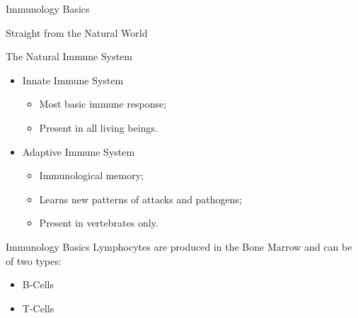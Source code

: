 \documentclass[xcolor=svgnames]{beamer}
\newcommand{\introframe}[2]{
    \begin{frame}
	   \vfill
	   \hfill\Huge{#1}
	   
	   \vspace{1em}
	   
	   \hfill\Large{#2}
	   \vfill
    \end{frame}
}
\begin{document}
	\introframe{Immunology Basics}{Straight from the Natural World}
	
        \begin{frame}{The Natural Immune System}        
            \begin{itemize}
                \item Innate Immune System
                \begin{itemize}
                    \item Most basic immune response;
                    \item Present in all living beings.
                \end{itemize}
                \item Adaptive Immune System
                \begin{itemize}
                    \item Immunological memory;
                    \item Learns new patterns of attacks and pathogens;
                    \item Present in vertebrates only.
                \end{itemize}
            \end{itemize}
	    \end{frame}
        
        \begin{frame}{Immunology Basics}
            Lymphocytes are produced in the Bone Marrow and can be of two types:
            \vspace{1em}
        	\begin{itemize}
                \item B-Cells
            	\item T-Cells
         	\end{itemize}
    	\end{frame}
    	
\end{document}
